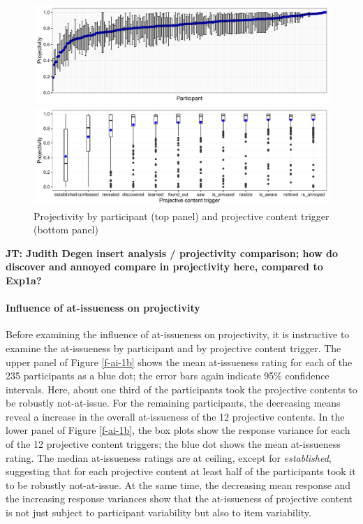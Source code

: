 \documentclass[11pt,fleqn]{article}
\newcommand{\6}{\mbox{$[\hspace*{-.6mm}[$}}
\newcommand{\9}{\mbox{$]\hspace*{-.6mm}]$}}
\newcommand{\jt}[1]{\textbf{\color{blue}JT: #1}}
\begin{document}
\begin{figure}[!h]

\begin{center}
\includegraphics[width=16cm]{../results/exp1b/graphs/projection-subjectmeans}

\includegraphics[width=16cm]{../results/exp1b/graphs/boxplot-projection}

\end{center}
\caption{Projectivity by participant (top panel) and projective content trigger (bottom panel)}
\label{f-proj-1b}
\end{figure}

\jt{Judith Degen insert analysis / projectivity comparison; how do discover and annoyed compare in projectivity here, compared to Exp1a?}


\paragraph{Influence of at-issueness on projectivity} Before examining the influence of at-issueness on projectivity, it is instructive to examine the at-issueness by participant and by projective content trigger. The upper panel of Figure \ref{f-ai-1b} shows the mean at-issueness rating for each of the 235 participants as a blue dot; the error bars again indicate 95\% confidence intervals. Here, about one third of the participants took the projective contents to be robustly not-at-issue. For the remaining participants, the decreasing means reveal a increase in the overall at-issueness of the 12 projective contents. In the lower panel of Figure \ref{f-ai-1b}, the box plots show the response variance for each of the 12 projective content triggers; the blue dot shows the mean at-issueness rating. The median at-issueness ratings are at ceiling, except for {\em established}, suggesting that for each projective content at least half of the participants took it to be robustly not-at-issue. At the same time, the decreasing mean response and the increasing response variances show that the at-issueness of projective content is not just subject to participant variability but also to item variability.
\end{document}
